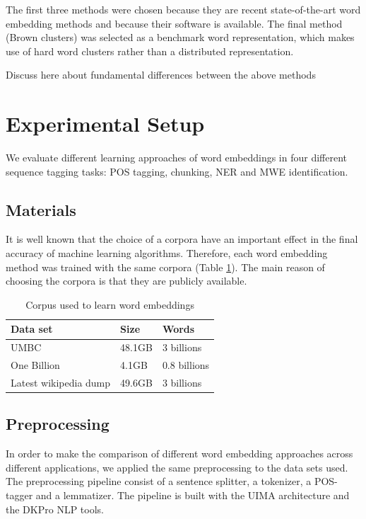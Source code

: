\documentclass[11pt]{article}
\begin{document}
The first three methods were chosen because they are recent
state-of-the-art word embedding methods and because their software is
available. The final method (Brown clusters) was selected as a benchmark word representation, which makes use of hard word clusters rather than a distributed representation.

Discuss here about fundamental differences between the above methods


\section{Experimental Setup}
We evaluate different learning approaches of word embeddings in four different sequence tagging tasks: POS tagging, chunking, NER and MWE identification.

\subsection{Materials}
It is well known that the choice of a corpora have an important effect in the final accuracy of machine learning algorithms. 
Therefore, each word embedding method was trained with the same corpora (Table \ref{corpus}). The main reason of choosing the corpora 
is that they are publicly available. 

\begin{table}[h]
\begin{center}
\begin{small}
\begin{tabular}{lll}
\hline
\textbf{Data set} & \textbf{Size} & \textbf{Words} \\ \hline
UMBC 	& 48.1GB & 3 billions \\
One Billion 	& 4.1GB & 0.8 billions  \\
Latest wikipedia dump & 49.6GB & 3 billions \\
\end{tabular}
\end{small}
\label{corpus}
\caption{Corpus used to learn word embeddings}
\end{center}
\end{table}

\subsection{Preprocessing}

In order to make the comparison of different word embedding approaches across different applications, we applied the same preprocessing to the data sets used. 
The preprocessing pipeline consist of a sentence splitter, a tokenizer, a POS-tagger and a lemmatizer. The pipeline is built with the UIMA architecture and the DKPro NLP tools. 
\end{document}
